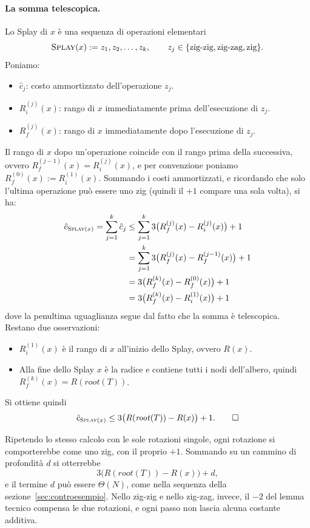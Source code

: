 \paragraph{La somma telescopica.}
Lo Splay di $x$ è una sequenza di operazioni elementari
\[
\textsc{Splay}(x) := z_1, z_2, \dots, z_k, \qquad z_j \in \{\text{zig-zig}, \text{zig-zag}, \text{zig}\}.
\]
Poniamo:
\begin{itemize}
    \item $\hat{c}_j$: costo ammortizzato dell'operazione $z_j$.
    \item $R_i^{(j)}(x)$: rango di $x$ immediatamente prima dell'esecuzione di $z_j$.
    \item $R_f^{(j)}(x)$: rango di $x$ immediatamente dopo l'esecuzione di $z_j$.
\end{itemize}
Il rango di $x$ dopo un'operazione coincide con il rango prima della successiva, ovvero $R_f^{(j-1)}(x) = R_i^{(j)}(x)$, e per convenzione poniamo $R_f^{(0)}(x) := R_i^{(1)}(x)$. Sommando i costi ammortizzati, e ricordando che solo l'ultima operazione può essere uno zig (quindi il $+1$ compare una sola volta), si ha:
\[
\begin{aligned}
\hat{c}_{\textsc{Splay}(x)} = \sum_{j=1}^{k} \hat{c}_j
&\le \sum_{j=1}^{k} 3\big(R_f^{(j)}(x) - R_i^{(j)}(x)\big) + 1 \\
&= \sum_{j=1}^{k} 3\big(R_f^{(j)}(x) - R_f^{(j-1)}(x)\big) + 1 \\
&= 3\big(R_f^{(k)}(x) - R_f^{(0)}(x)\big) + 1 \\
&= 3\big(R_f^{(k)}(x) - R_i^{(1)}(x)\big) + 1
\end{aligned}
\]
dove la penultima uguaglianza segue dal fatto che la somma è telescopica. Restano due osservazioni:
\begin{itemize}
    \item $R_i^{(1)}(x)$ è il rango di $x$ all'inizio dello Splay, ovvero $R(x)$.
    \item Alla fine dello Splay $x$ è la radice e contiene tutti i nodi dell'albero, quindi $R_f^{(k)}(x) = R(\mathit{root}(T))$.
\end{itemize}
Si ottiene quindi
\[
\hat{c}_{\textsc{Splay}(x)} \le 3\big(R(\mathit{root}(T)) - R(x)\big) + 1. \tag*{$\square$}
\]

\begin{osservazione}
Ripetendo lo stesso calcolo con le sole rotazioni singole, ogni rotazione si comporterebbe come uno zig, con il proprio $+1$. Sommando su un cammino di profondità $d$ si otterrebbe
\[
3\big(R(\mathit{root}(T)) - R(x)\big) + d,
\]
e il termine $d$ può essere $\Theta(N)$, come nella sequenza della sezione~\ref{sec:controesempio}. Nello zig-zig e nello zig-zag, invece, il $-2$ del lemma tecnico compensa le due rotazioni, e ogni passo non lascia alcuna costante additiva.
\end{osservazione}

